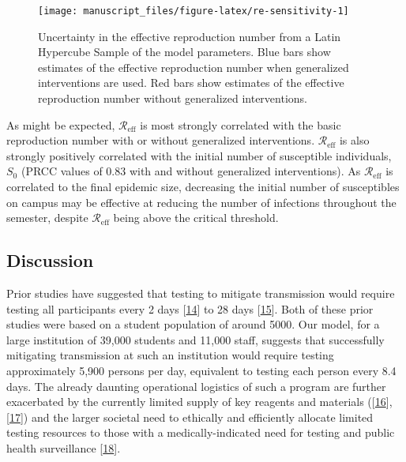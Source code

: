 \documentclass[
]{article}
\begin{document}
\begin{figure}

{\centering \texttt{[image: manuscript\_files/figure-latex/re-sensitivity-1]} 

}

\caption{\label{fig:re-sensitivity}Uncertainty in the effective reproduction number from a Latin Hypercube Sample of the model parameters. Blue bars show estimates of the effective reproduction number when generalized interventions are used. Red bars show estimates of the effective reproduction number without generalized interventions.}\label{fig:re-sensitivity}
\end{figure}

As might be expected, \(\mathcal{R}_\text{eff}\) is most strongly
correlated with the basic reproduction number with or without
generalized interventions. \(\mathcal{R}_\text{eff}\) is also strongly
positively correlated with the initial number of susceptible
individuals, \(S_0\) (PRCC values of \(0.83\) with and without
generalized interventions). As \(\mathcal{R}_\text{eff}\) is correlated
to the final epidemic size, decreasing the initial number of
susceptibles on campus may be effective at reducing the number of
infections throughout the semester, despite \(\mathcal{R}_\text{eff}\)
being above the critical threshold.

\hypertarget{discussion}{%
\subsection{Discussion}\label{discussion}}

Prior studies have suggested that testing to mitigate transmission would
require testing all participants every 2 days
{[}\protect\hyperlink{ref-Paltiel2020-yp}{14}{]} to 28 days
{[}\protect\hyperlink{ref-Bradley2020-ig}{15}{]}. Both of these prior
studies were based on a student population of around 5000. Our model,
for a large institution of 39,000 students and 11,000 staff, suggests
that successfully mitigating transmission at such an institution would
require testing approximately 5,900 persons per day, equivalent to
testing each person every 8.4 days. The already daunting operational
logistics of such a program are further exacerbated by the currently
limited supply of key reagents and materials
({[}\protect\hyperlink{ref-Wu2020-bc}{16}{]},
{[}\protect\hyperlink{ref-Armour2020-pr}{17}{]}) and the larger societal
need to ethically and efficiently allocate limited testing resources to
those with a medically-indicated need for testing and public health
surveillance
{[}\protect\hyperlink{ref-American_Medical_Association2020-mi}{18}{]}.
\end{document}
